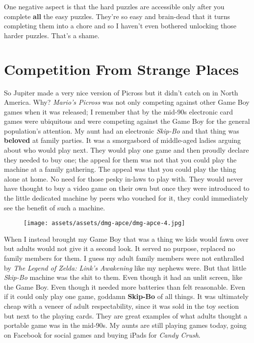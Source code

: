 \documentclass{book}
\begin{document}
One negative aspect is that the hard puzzles are accessible only after you complete \textbf{all} the easy puzzles. They’re so easy and brain-dead that it turns completing them into a chore and so I haven’t even bothered unlocking those harder puzzles. That’s a shame.

\FloatBarrier\needspace{10mm}\section*{Competition From Strange Places}\nopagebreak[4]

So Jupiter made a very nice version of Picross but it didn’t catch on in North America. Why? \emph{Mario’s Picross} was not only competing against other Game Boy games when it was released; I remember that by the mid-90s electronic card games were ubiquitous and were competing against the Game Boy for the general population’s attention. My aunt had an electronic \emph{Skip-Bo} and that thing was \textbf{beloved} at family parties. It was a smorgasbord of middle-aged ladies arguing about who would play next. They would play one game and then proudly declare they needed to buy one; the appeal for them was not that you could play the machine at a family gathering. The appeal was that you could play the thing alone at home. No need for those pesky in-laws to play with. They would never have thought to buy a video game on their own but once they were introduced to the little dedicated machine by peers who vouched for it, they could immediately see the benefit of such a machine.

\begin{figure}[hbt]
\vskip 10pt
\centering \texttt{[image: assets/assets/dmg-apce/dmg-apce-4.jpg]}
\vskip 6pt
\end{figure}
When I instead brought my Game Boy that was a thing we kids would fawn over but adults would not give it a second look. It served no purpose, replaced no family members for them. I guess my adult family members were not enthralled by \emph{The Legend of Zelda: Link’s Awakening} like my nephews were. But that little \emph{Skip-Bo} machine was the shit to them. Even though it had an unlit screen, like the Game Boy. Even though it needed more batteries than felt reasonable. Even if it could only play one game, goddamn \textbf{Skip-Bo} of all things. It was ultimately cheap with a veneer of adult respectability, since it was sold in the toy section but next to the playing cards. They are great examples of what adults thought a portable game was in the mid-90s. My aunts are still playing games today, going on Facebook for social games and buying iPads for \emph{Candy Crush}.
\end{document}
